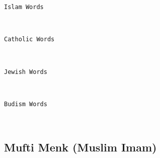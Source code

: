 \documentclass[11pt]{article}
\begin{document}
    \begin{Verbatim}[commandchars=\\\{\}]
Islam Words
    \end{Verbatim}

    \begin{center}
    \end{center}
    { \hspace*{\fill} \\}
    
    \begin{Verbatim}[commandchars=\\\{\}]
Catholic Words
    \end{Verbatim}

    \begin{center}
    \end{center}
    { \hspace*{\fill} \\}
    
    \begin{Verbatim}[commandchars=\\\{\}]
Jewish Words
    \end{Verbatim}

    \begin{center}
    \end{center}
    { \hspace*{\fill} \\}
    
    \begin{Verbatim}[commandchars=\\\{\}]
Budism Words
    \end{Verbatim}

    \begin{center}
    \end{center}
    { \hspace*{\fill} \\}
    
    \hypertarget{mufti-menk-muslim-imam}{%
\subsection{Mufti Menk (Muslim Imam)}\label{mufti-menk-muslim-imam}}
\end{document}
